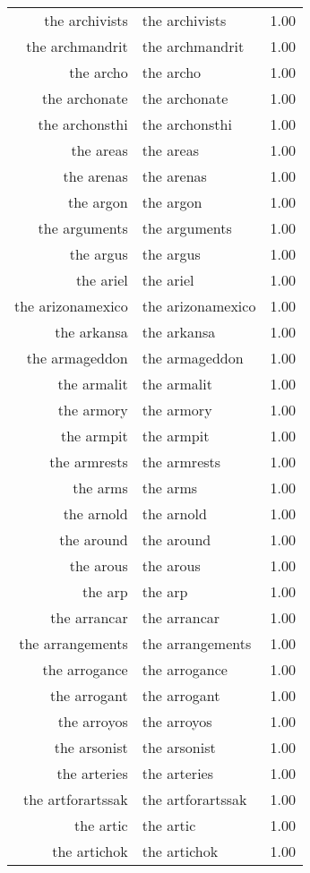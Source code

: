 \begin{table}[ht]
\begin{tabular}{rlr}
  the archivists & the archivists & 1.00 \\ 
  the archmandrit & the archmandrit & 1.00 \\ 
  the archo & the archo & 1.00 \\ 
  the archonate & the archonate & 1.00 \\ 
  the archonsthi & the archonsthi & 1.00 \\ 
  the areas & the areas & 1.00 \\ 
  the arenas & the arenas & 1.00 \\ 
  the argon & the argon & 1.00 \\ 
  the arguments & the arguments & 1.00 \\ 
  the argus & the argus & 1.00 \\ 
  the ariel & the ariel & 1.00 \\ 
  the arizonamexico & the arizonamexico & 1.00 \\ 
  the arkansa & the arkansa & 1.00 \\ 
  the armageddon & the armageddon & 1.00 \\ 
  the armalit & the armalit & 1.00 \\ 
  the armory & the armory & 1.00 \\ 
  the armpit & the armpit & 1.00 \\ 
  the armrests & the armrests & 1.00 \\ 
  the arms & the arms & 1.00 \\ 
  the arnold & the arnold & 1.00 \\ 
  the around & the around & 1.00 \\ 
  the arous & the arous & 1.00 \\ 
  the arp & the arp & 1.00 \\ 
  the arrancar & the arrancar & 1.00 \\ 
  the arrangements & the arrangements & 1.00 \\ 
  the arrogance & the arrogance & 1.00 \\ 
  the arrogant & the arrogant & 1.00 \\ 
  the arroyos & the arroyos & 1.00 \\ 
  the arsonist & the arsonist & 1.00 \\ 
  the arteries & the arteries & 1.00 \\ 
  the artforartssak & the artforartssak & 1.00 \\ 
  the artic & the artic & 1.00 \\ 
  the artichok & the artichok & 1.00 \\ 

\end{tabular}
\end{table}
